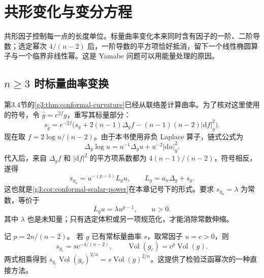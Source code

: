 
% 
% 

\section{共形变化与变分方程}
\label{g3:sec:2402}

共形因子控制每一点的长度单位。标量曲率变化本来同时含有因子的一阶、二阶导数；选定幂次 \(4/(n-2)\) 后，一阶导数的平方项恰好抵消，留下一个线性椭圆算子与一个临界非线性幂。这是 Yamabe 问题可以用能量处理的原因。

\subsection{\texorpdfstring{\(n\ge3\) 时标量曲率变换}{n≥3 时标量曲率变换}}
\label{g3:subsec:2402:01}
第3.4节的\cref{g3:thm:conformal-curvature}已经从联络差计算曲率。为了核对这里使用的符号，令 \(\widehat g=e^{2f}g\)，重写其标量部分：
\[
	s_{\widehat g}=e^{-2f}\bigl(s_g+2(n-1)\Delta_gf
	-(n-1)(n-2)|\mathrm df|_g^2\bigr).
\]
现在取 \(f=2\log u/(n-2)\)。由于本书使用非负 Laplace 算子，链式公式为
\[
	\Delta_g\log u=u^{-1}\Delta_gu+u^{-2}|\mathrm du|_g^2.
\]
代入后，来自 \(\Delta_gf\) 和 \(|\mathrm df|^2\) 的平方项系数都为 \(4(n-1)/(n-2)\)，符号相反，遂得
\begin{equation}\label{g3:eq:yamabe-scalar-transformation}
	s_{g_u}=u^{-(p-1)}L_gu,
	\qquad L_g=a_n\Delta_g+s_g.
\end{equation}
这也就是\cref{g3:cor:conformal-scalar-power}在本章记号下的形式。要求 \(s_{g_u}=\lambda\) 为常数，等价于
\begin{equation}\label{g3:eq:yamabe-equation}
	L_gu=\lambda u^{p-1},\qquad u>0.
\end{equation}
其中 \(\lambda\) 也是未知量；只有选定体积或另一项规范化，才能消除常数伸缩。

\begin{example}
	记 \(p=2n/(n-2)\)。
	若 \(g\) 已有常标量曲率 \(s\)，取常因子 \(u=c>0\)，则
	\[
		s_{g_c}=s c^{-4/(n-2)},\qquad
		\operatorname{Vol}(g_c)=c^p\operatorname{Vol}(g).
	\]
	两式相乘得到 \(s_{g_c}\operatorname{Vol}(g_c)^{2/n}=s\operatorname{Vol}(g)^{2/n}\)。这提供了检验泛函幂次的一种直接方法。
\end{example}

